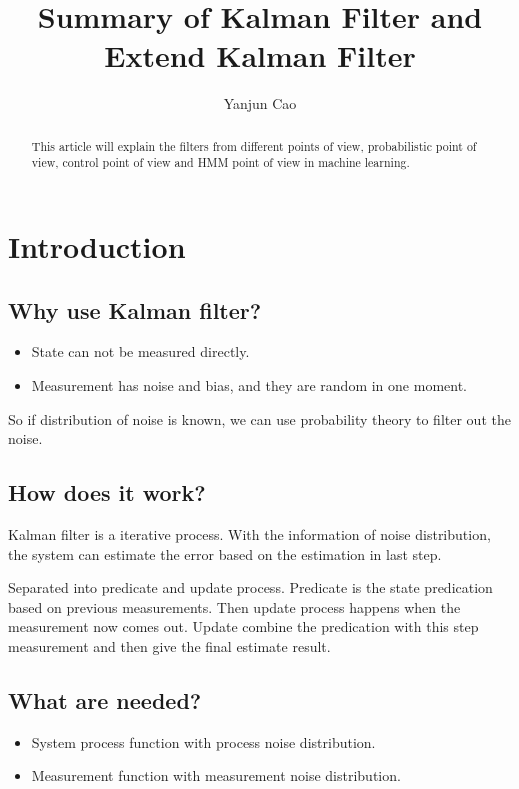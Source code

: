 \documentclass[]{article}
\title{Summary of Kalman Filter and Extend Kalman Filter}
\author{Yanjun Cao}
\begin{document}
\maketitle

\begin{abstract}
	This article will explain the filters from different points of view, probabilistic point of view, control point of view and HMM point of view in machine learning.

\end{abstract}

\section{Introduction}

\subsection{Why use Kalman filter?}
\begin{itemize}
	\item State can not be measured directly.
	\item Measurement has noise and bias, and they are random in one moment.
\end{itemize}
So if distribution of noise is known, we can use probability theory to filter out the noise. 

\subsection{How does it work?}
Kalman filter is a iterative process. With the information of noise distribution, the system can estimate the error based on the estimation in last step.

Separated into predicate and update process. Predicate is the state predication based on previous measurements. Then update process happens when the measurement now comes out. Update combine the predication with this step measurement and then give the final estimate result.

\subsection{What are needed?}
\begin{itemize}
	\item System process function with process noise distribution.
	\item Measurement function with measurement noise distribution.
\end{itemize}
\end{document}
